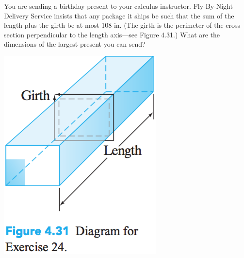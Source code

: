 \documentclass[12pt,letterpaper]{hmcpset}
\begin{document}
\begin{problem}[Colley 4.3.24]
    You are sending a birthday present to your calculus
    instructor. Fly-By-Night Delivery Service insists that any package
    it ships be such that the sum of the length plus the girth be at
    most 108 in. (The girth is the perimeter of the cross section
    perpendicular to the length axis---see Figure 4.31.) What are the
    dimensions of the largest present you can send?
    \begin{center}
        \includegraphics[scale=0.8]{img/4_3_24}
    \end{center}
\end{problem}
\begin{solution}
    \vfill
\end{solution}
\newpage
\end{document}
